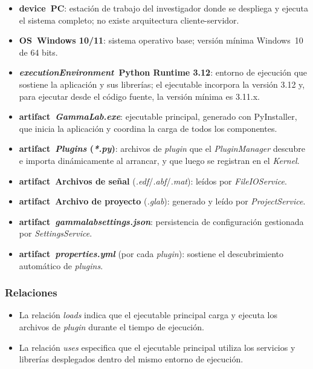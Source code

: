 \documentclass[12pt,letterpaper,oneside]{article}
\DeclareRobustCommand{\_}{\textunderscore\allowbreak}
\begin{document}
\begin{itemize}
    \item \textbf{\guillemotleft device\guillemotright\ PC}: estaci\'on de trabajo del investigador donde se despliega y ejecuta el sistema completo; no existe arquitectura cliente-servidor.
    \item \textbf{\guillemotleft OS\guillemotright\ Windows 10/11}: sistema operativo base; versi\'on m\'inima Windows~10 de 64 bits.
    \item \textbf{\guillemotleft \textit{executionEnvironment}\guillemotright\ Python Runtime 3.12}: entorno de ejecuci\'on que sostiene la aplicaci\'on y sus librer\'ias; el ejecutable incorpora la versi\'on 3.12 y, para ejecutar desde el c\'odigo fuente, la versi\'on m\'inima es 3.11.x.
    \item \textbf{\guillemotleft artifact\guillemotright\ \textit{GammaLab.exe}}: ejecutable principal, generado con PyInstaller, que inicia la aplicaci\'on y coordina la carga de todos los componentes.
    \item \textbf{\guillemotleft artifact\guillemotright\ \textit{Plugins} (\textit{*.py})}: archivos de \textit{plugin} que el \textit{PluginManager} descubre e importa din\'amicamente al arrancar, y que luego se registran en el \textit{Kernel}.
    \item \textbf{\guillemotleft artifact\guillemotright\ Archivos de se\~nal} (\textit{.edf}/\textit{.abf}/\textit{.mat}): le\'idos por \textit{FileIOService}.
    \item \textbf{\guillemotleft artifact\guillemotright\ Archivo de proyecto} (\textit{.glab}): generado y le\'ido por \textit{ProjectService}.
    \item \textbf{\guillemotleft artifact\guillemotright\ \textit{gamma\_\allowbreak lab\_\allowbreak settings.\allowbreak json}}: persistencia de configuraci\'on gestionada por \textit{Settings\-Service}.
    \item \textbf{\guillemotleft artifact\guillemotright\ \textit{properties.yml}} (por cada \textit{plugin}): sostiene el descubrimiento autom\'atico de \textit{plugins}.
\end{itemize}

\subsubsection{Relaciones}

\begin{itemize}
    \item La relaci\'on \textit{loads} indica que el ejecutable principal carga y ejecuta los archivos de \textit{plugin} durante el tiempo de ejecuci\'on.
    \item La relaci\'on \textit{uses} especifica que el ejecutable principal utiliza los servicios y librer\'ias desplegados dentro del mismo entorno de ejecuci\'on.
\end{itemize}
\end{document}
